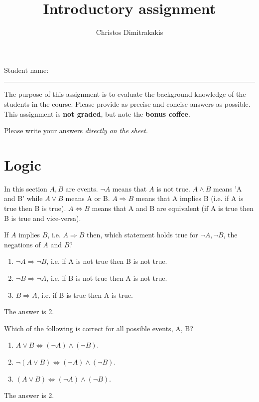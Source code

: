 \documentclass[a4paper]{article}
\title{Introductory assignment}
\author{Christos Dimitrakakis}
\def\solution {1}
\begin{document}
\maketitle

{\Large Student name:}
\vspace{0.5em}
\hrule
\vspace{1em}
The purpose of this assignment is to evaluate the background knowledge
of the students in the course. Please provide as precise and concise
answers as possible. This assignment is \textbf{not graded}, but note the \textbf{bonus coffee}.

Please write your answers \emph{directly on the sheet.}

\section{Logic}
In this section $A, B$ are events. $\neg A$ means that $A$ is not true. $A \wedge B$ means 'A and B' while $A
\vee B$ means A or B. $A \Rightarrow B$ means that A implies B (i.e. if A is true then B is true).
$A \Leftrightarrow B$ means that A and B are equivalent (if A is true then B is true and vice-versa).

\begin{exercise}
  If $A$ implies $B$, i.e. $A \Rightarrow B$ then, which statement holds true for $\neg A, \neg B$, the negations of $A$ and $B$?
  \begin{enumerate}
  \item $\neg A \Rightarrow \neg B$, i.e. if A is not true then B is not true.
  \item $\neg B \Rightarrow \neg A$, i.e. if B is not true then A is not true.
  \item $B \Rightarrow A$, i.e. if B is true then A is true.
  \end{enumerate}
\end{exercise}
\ifdefined \solution
The answer is 2.
\fi

\begin{exercise}
  Which of the following is correct for all possible events, A, B?
  \begin{enumerate}
  \item $A \vee B \Leftrightarrow  (\neg A) \wedge (\neg B)$.
  \item $\neg (A \vee B) \Leftrightarrow (\neg A) \wedge (\neg B)$.
  \item $(A \vee B) \Leftrightarrow (\neg A) \wedge (\neg B)$.
  \end{enumerate}
\end{exercise}
\ifdefined \solution
The answer is 2.
\fi
\end{document}

